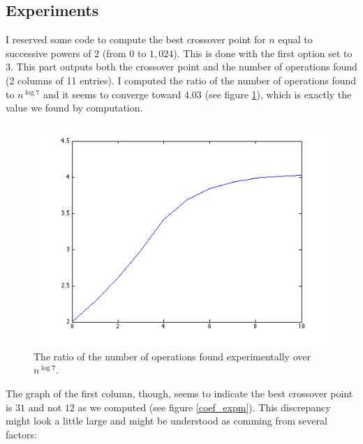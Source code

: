 \documentclass{article}
\begin{document}
\subsection{Experiments}
I reserved some code to compute the best crossover point for $ n $ equal to successive powers of $ 2 $ (from $ 0 $ to $ 1,024 $).  
This is done with the first option set to $ 3 $.  
This part outputs both the crossover point and the number of operations found (2 columns of 11 entries).  
I computed the ratio of the number of operations found to $ n^{\log 7} $ and it seems to converge toward $ 4.03 $ (see figure \ref{rat_coef}), which is exactly the value we found by computation.
\begin{figure}[h]
\vspace{.2in}
\centerline {
	\includegraphics[scale=.6]{rat_coef.png}
}
\caption{The ratio of the number of operations found experimentally over $n^{\log 7} $. \label{rat_coef}}
\end{figure}
The graph of the first column, though, seems to indicate the best crossover point is $ 31 $ and not $ 12 $ as we computed (see figure \ref{coef_expm}).
This discrepancy might look a little large and might be understood as comming from several factors: 
\end{document}
